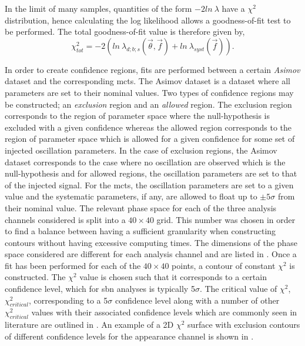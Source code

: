 In the limit of many samples, quantities of the form $-2ln~\lambda$ have a $\chi^2$ distribution, hence calculating the log likelihood allows a goodness-of-fit test to be performed. The total goodness-of-fit value is therefore given by,
\begin{equation}
    \chi^2_{tot} = -2(ln~\lambda_{d;b;s}(\vec{\theta}, \vec{f}) + ln~\lambda_{syst}(\vec{f})).
\end{equation}

In order to create confidence regions, fits are performed between a certain \textit{Asimov} dataset and the corresponding \glspl{mct}. The Asimov dataset is a dataset where all parameters are set to their nominal values. Two types of confidence regions may be constructed; an \textit{exclusion} region and an \textit{allowed} region. The exclusion region corresponds to the region of parameter space where the null-hypothesis is excluded with a given confidence whereas the allowed region corresponds to the region of parameter space which is allowed for a given confidence for some set of injected oscillation parameters. In the case of exclusion regions, the Asimov dataset corresponds to the case where no oscillation are observed which is the null-hypothesis and for allowed regions, the oscillation parameters are set to that of the injected signal.  For the \glspl{mct}, the oscillation parameters are set to a given value and the systematic parameters, if any, are allowed to float up to $\pm5\sigma$ from their nominal value. The relevant phase space for each of the three analysis channels considered is split into a $40 \times 40$ grid. This number was chosen in order to find a balance between having a sufficient granularity when constructing contours without having excessive computing times. The dimensions of the phase space considered are different for each analysis channel and are listed in . Once a fit has been performed for each of the $40 \times 40$ points, a contour of constant $\chi^2$ is constructed. The $\chi^2$ value is chosen such that it corresponds to a certain confidence level, which for \gls{sbn} analyses is typically 5$\sigma$. The critical value of $\chi^2$, $\chi^2_{critical}$, corresponding to a 5$\sigma$ confidence level along with a number of other $\chi^2_{critical}$ values with their associated confidence levels which are commonly seen in literature are outlined in . An example of a 2D $\chi^2$ surface with exclusion contours of different confidence levels for the \nue appearance channel is shown in .

